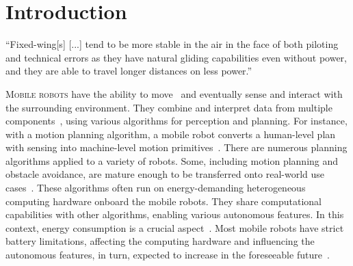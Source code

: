 
%
%
%
%
\chapter{Introduction}
\label{cp:intro}

\begin{chapquote}{\cite{wang2017curvature}}
  ``Fixed-wing[s] [...] tend to be more stable in the air in the face of both piloting and technical errors as they have natural gliding capabilities even without power, and they are able to travel longer distances on less power.''
\end{chapquote}

\vspace*{1em}

\lettrine{M}{obile robots} have the ability to move~\citep{corke2017robotics} and eventually sense and interact with the surrounding environment. They combine and interpret data from multiple components~\citep{mei2006deployment}, using various algorithms for perception and planning. For instance, with a motion planning algorithm, a mobile robot converts a human-level plan with sensing into machine-level motion primitives~\citep{lavalle2006planning}. There are numerous planning algorithms applied to a variety of robots. Some, including motion planning and obstacle avoidance, are mature enough to be transferred onto real-world use cases~\citep{siciliano2016bspringer}. These algorithms often run on energy-demanding heterogeneous computing hardware onboard the mobile robots. They share computational capabilities with other algorithms, enabling various autonomous features. In this context, energy consumption is a crucial aspect~\citep{jaiem2016step}. Most mobile robots have strict battery limitations, affecting the computing hardware and influencing the autonomous features, in turn, expected to increase in the foreseeable future~\citep{fisher2013verifying}.

